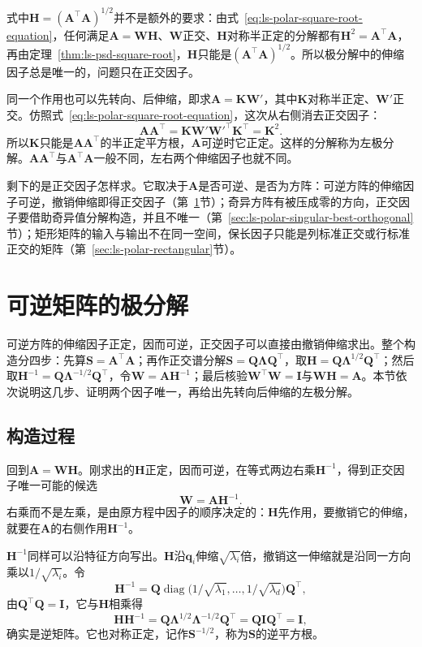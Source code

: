 式中$\bm H=(\bm A^\top\bm A)^{1/2}$并不是额外的要求：由式~\eqref{eq:ls-polar-square-root-equation}，任何满足$\bm A=\bm W\bm H$、$\bm W$正交、$\bm H$对称半正定的分解都有$\bm H^2=\bm A^\top\bm A$，再由定理~\ref{thm:ls-psd-square-root}，$\bm H$只能是$(\bm A^\top\bm A)^{1/2}$。所以极分解中的伸缩因子总是唯一的，问题只在正交因子。

同一个作用也可以先转向、后伸缩，即求$\bm A=\bm K\bm W'$，其中$\bm K$对称半正定、$\bm W'$正交。仿照式~\eqref{eq:ls-polar-square-root-equation}，这次从右侧消去正交因子：
\[
 \bm A\bm A^\top=\bm K\bm W'\bm W'^\top\bm K^\top=\bm K^2 .
\]
所以$\bm K$只能是$\bm A\bm A^\top$的半正定平方根，$\bm A$可逆时它正定。这样的分解称为左极分解。$\bm A\bm A^\top$与$\bm A^\top\bm A$一般不同，左右两个伸缩因子也就不同。

剩下的是正交因子怎样求。它取决于$\bm A$是否可逆、是否为方阵：可逆方阵的伸缩因子可逆，撤销伸缩即得正交因子（第~\ref{sec:ls-polar-orthogonal-factor}节）；奇异方阵有被压成零的方向，正交因子要借助奇异值分解构造，并且不唯一（第~\ref{sec:ls-polar-singular-best-orthogonal}节）；矩形矩阵的输入与输出不在同一空间，保长因子只能是列标准正交或行标准正交的矩阵（第~\ref{sec:ls-polar-rectangular}节）。

\section{可逆矩阵的极分解}
\label{sec:ls-polar-orthogonal-factor}

可逆方阵的伸缩因子正定，因而可逆，正交因子可以直接由撤销伸缩求出。整个构造分四步：先算$\bm S=\bm A^\top\bm A$；再作正交谱分解$\bm S=\bm Q\bm\Lambda\bm Q^\top$，取$\bm H=\bm Q\bm\Lambda^{1/2}\bm Q^\top$；然后取$\bm H^{-1}=\bm Q\bm\Lambda^{-1/2}\bm Q^\top$，令$\bm W=\bm A\bm H^{-1}$；最后核验$\bm W^\top\bm W=\bm I$与$\bm W\bm H=\bm A$。本节依次说明这几步、证明两个因子唯一，再给出先转向后伸缩的左极分解。

\subsection{构造过程}
\label{sec:ls-polar-invertible-construction}

回到$\bm A=\bm W\bm H$。刚求出的$\bm H$正定，因而可逆，在等式两边右乘$\bm H^{-1}$，得到正交因子唯一可能的候选
\[
 \bm W=\bm A\bm H^{-1}.
\]
右乘而不是左乘，是由原方程中因子的顺序决定的：$\bm H$先作用，要撤销它的伸缩，就要在$\bm A$的右侧作用$\bm H^{-1}$。

$\bm H^{-1}$同样可以沿特征方向写出。$\bm H$沿$\bm q_i$伸缩$\sqrt{\lambda_i}$倍，撤销这一伸缩就是沿同一方向乘以$1/\sqrt{\lambda_i}$。令
\[
 \bm H^{-1}=\bm Q\operatorname{diag}\bigl(1/\sqrt{\lambda_1},\ldots,1/\sqrt{\lambda_d}\bigr)\bm Q^\top ,
\]
由$\bm Q^\top\bm Q=\bm I$，它与$\bm H$相乘得
\[
 \bm H\bm H^{-1}=\bm Q\bm\Lambda^{1/2}\bm\Lambda^{-1/2}\bm Q^\top=\bm Q\bm I\bm Q^\top=\bm I ,
\]
确实是逆矩阵。它也对称正定，记作$\bm S^{-1/2}$，称为$\bm S$的逆平方根。

